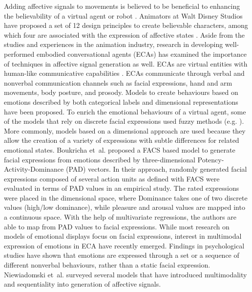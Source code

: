 Adding affective signals to movements is believed to be beneficial to enhancing the believability of a virtual agent or robot \cite{lasseter1987principles}. Animators at Walt Disney Studios have proposed a set of 12 design principles to create believable characters, among which four are associated with the expression of affective states \cite{lasseter1987principles, kerlow2004art}. Aside from the studies and experiences in the animation industry, research in developing well-performed embodied conversational agents (ECAs) has examined the importance of techniques in affective signal generation as well. ECAs are virtual entities with human-like communicative capabilities \cite{cassell2000embodied, niewiadomski2013computational}. ECAs communicate through verbal and nonverbal communication channels such as facial expressions, hand and arm movements, body posture, and prosody. Models to create behaviours based on emotions described by both categorical labels and dimensional representations have been proposed. To enrich the emotional behaviours of a virtual agent, some of the models that rely on discrete facial expressions used fuzzy methods (e.g. \cite{bui2004creating}). More commonly, models based on a dimensional approach are used because they allow the creation of a variety of expressions with subtle differences for related emotional states. Boukricha et~al. \cite{boukricha2009pleasure} proposed a FACS \cite{ekm02} based model to generate facial expressions from emotions described by three-dimensional Potency-Activity-Dominance (PAD) vectors. In their approach, randomly generated facial expressions composed of several action units as defined with FACS were evaluated in terms of PAD values in an empirical study. The rated expressions were placed in the dimensional space, where Dominance takes one of two discrete values (high/low dominance), while pleasure and arousal values are mapped into a continuous space. With the help of multivariate regressions, the authors are able to map from PAD values to facial expressions. While most research on models of emotional displays focus on facial expressions, interest in multimodal expression of emotions in ECA have recently emerged. Findings in psychological studies have shown that emotions are expressed through a set or a sequence of different nonverbal behaviours, rather than a static facial expression. Niewiadomski et~al. \cite{niewiadomski2013computational} surveyed several models that have introduced multimodality and sequentiality into generation of affective signals.

